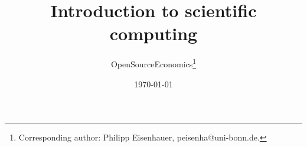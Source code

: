 \title{Introduction to scientific computing}
\author{OpenSourceEconomics\thanks{Corresponding author: Philipp Eisenhauer, peisenha@uni-bonn.de.}}
\date{\today}
